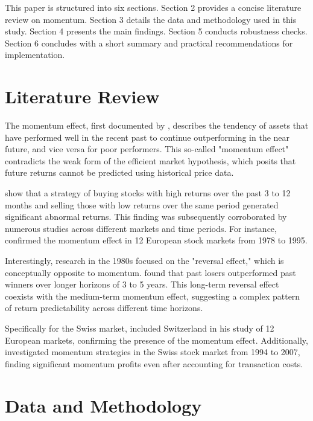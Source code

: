 \documentclass[a4paper,12pt]{article}
\begin{document}
    This paper is structured into six sections. Section 2 provides a concise literature review on momentum. Section 3 details the data and methodology used in this study. Section 4 presents the main findings. Section 5 conducts robustness checks. Section 6 concludes with a short summary and practical recommendations for implementation.
    
    \newpage
    
    \section{Literature Review}
    The momentum effect, first documented by \cite{jegatit1993}, describes the tendency of assets that have performed well in the recent past to continue outperforming in the near future, and vice versa for poor performers. This so-called "momentum effect" contradicts the weak form of the efficient market hypothesis, which posits that future returns cannot be predicted using historical price data. 
    
    \cite{jegatit1993} show that a strategy of buying stocks with high returns over the past 3 to 12 months and selling those with low returns over the same period generated significant abnormal returns. This finding was subsequently corroborated by numerous studies across different markets and time periods. For instance, \cite{rouwenhorst1998} confirmed the momentum effect in 12 European stock markets from 1978 to 1995. 
    
    Interestingly, research in the 1980s focused on the "reversal effect," which is conceptually opposite to momentum. \cite{debondt1987} found that past losers outperformed past winners over longer horizons of 3 to 5 years. This long-term reversal effect coexists with the medium-term momentum effect, suggesting a complex pattern of return predictability across different time horizons. 
    
    Specifically for the Swiss market, \cite{rouwenhorst1998} included Switzerland in his study of 12 European markets, confirming the presence of the momentum effect. Additionally, \cite{ammann2008} investigated momentum strategies in the Swiss stock market from 1994 to 2007, finding significant momentum profits even after accounting for transaction costs.
    
    \newpage
    
    \section{Data and Methodology}
\end{document}
